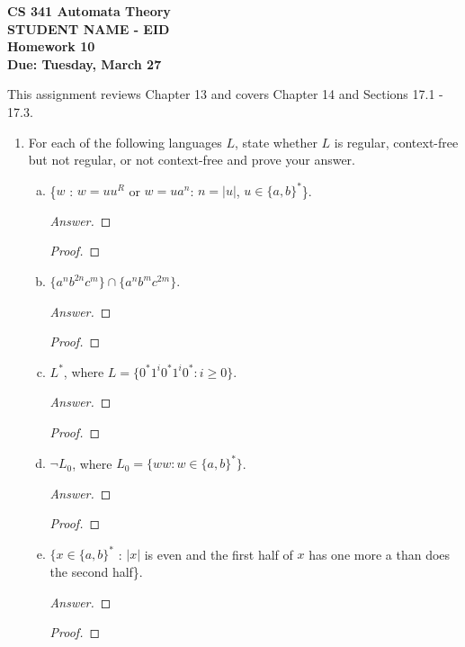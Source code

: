 \documentclass[10pt]{article}
\newcommand{\card}[1]{\left| #1 \right|}
\begin{document}
\begin{flushleft}
\textbf{\noindent
CS 341 Automata Theory \\
STUDENT NAME - EID \\
Homework 10 \\
Due: Tuesday, March 27}\\
\end{flushleft}
\noindent
This assignment reviews Chapter 13 and covers Chapter 14 and Sections 17.1 - 17.3. \\

\begin{enumerate}[1)]


\item
For each of the following languages $L$, state whether $L$ is regular, context-free but not regular, or not context-free and prove your answer.
\begin{enumerate}[a)]
\item
\{$w$ : $w = uu^R$ or $w = ua^n$: $n = \card{u}$, $u \in \{a, b\}^*$\}.
\begin{proof}[Answer]
\end{proof}
\begin{proof}[Proof]
\end{proof}

\item
$\{a^nb^{2n}c^m\} \cap \{a^nb^mc^{2m}\}$.
\begin{proof}[Answer]
\end{proof}
\begin{proof}[Proof]
\end{proof}

\item
$L^*$, where $L = \{0^*1^i0^*1^i0^* : i \geq 0\}$.
\begin{proof}[Answer]
\end{proof}
\begin{proof}[Proof]
\end{proof}

\item
$\lnot L_0$, where $L_0 = \{ww : w \in \{a, b\}^*\}$.
\begin{proof}[Answer]
\end{proof}
\begin{proof}[Proof]
\end{proof}

\item
$\{x \in \{a, b\}^*$ : $\card{x}$ is even and the first half of $x$ has one more a than does the second half\}.
\begin{proof}[Answer]
\end{proof}
\begin{proof}[Proof]
\end{proof}
\end{enumerate}


\end{enumerate}
\end{document}
